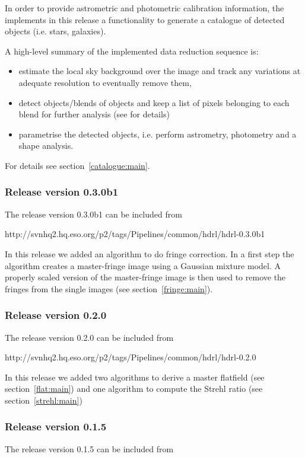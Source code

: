 In order to provide astrometric and photometric calibration
information, the \HDRL implements in this release a functionality to
generate a catalogue of detected objects (i.e. stars, galaxies).

A high-level summary of the implemented data reduction sequence is:
\begin{itemize}
\item estimate the local sky background over the image and track any
    variations at adequate resolution to eventually remove them,
\item detect objects/blends of objects and keep a list of pixels
    belonging to each blend for further analysis (see \cite{Irwin85}
    for details)
  \item parametrise the detected objects, i.e. perform astrometry,
    photometry and a shape analysis.
\end{itemize}

For details see section~\ref{catalogue:main}.

\subsubsection{Release version 0.3.0b1}
The \HDRL release version 0.3.0b1 can be included from

http://svnhq2.hq.eso.org/p2/tags/Pipelines/common/hdrl/hdrl-0.3.0b1

In this release we added an algorithm to do fringe correction. In a
first step the algorithm creates a master-fringe image using a
Gaussian mixture model. A properly scaled version of the
master-fringe image is then used to remove the fringes from the single
images (see section~\ref{fringe:main}).

\subsubsection{Release version 0.2.0}
The \HDRL release version 0.2.0 can be included from

http://svnhq2.hq.eso.org/p2/tags/Pipelines/common/hdrl/hdrl-0.2.0

In this release we added two algorithms to derive a master flatfield
(see section~\ref{flat:main}) and one algorithm to compute the Strehl
ratio (see section~\ref{strehl:main})


\subsubsection{Release version 0.1.5}
The \HDRL release version 0.1.5 can be included from

